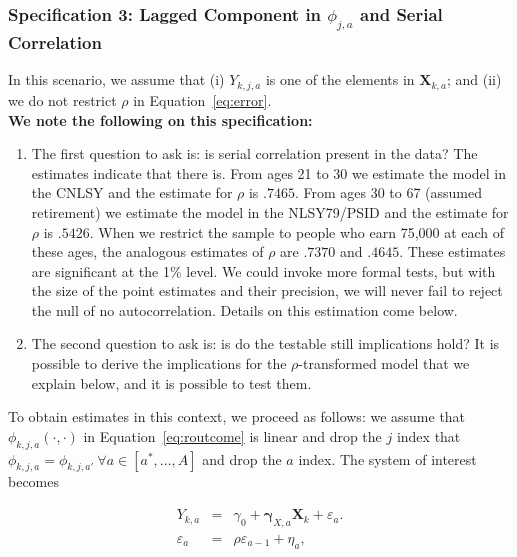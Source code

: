 \subsubsection{Specification 3: Lagged Component in $\phi_{j,a}$ and Serial Correlation} \label{section:laggedserial}

\noindent In this scenario, we assume that (i)  $Y_{k,j,a}$ is one of the elements in $\bm{X}_{k,a}$; and (ii) we do not restrict $\rho$ in Equation~\eqref{eq:error}.\\

\noindent \textbf{We note the following on this specification:}

\begin{enumerate}

\item The first question to ask is: is serial correlation present in the data? The estimates indicate that there is. From ages 21 to 30 we estimate the model in the CNLSY and the estimate for $\rho$ is $.7465$. From ages 30 to 67 (assumed retirement) we estimate the model in the NLSY79/PSID and the estimate for $\rho$ is $.5426$. When we restrict the sample to people who earn 75,000 at each of these ages, the analogous estimates of $\rho$ are $.7370$ and $.4645$. These estimates are significant at the 1\% level. We could invoke more formal tests, but with the size of the point estimates and their precision, we will never fail to reject the null of no autocorrelation. Details on this estimation come below.\\

\item The second question to ask is: is do the testable still implications hold?  It is possible to derive the implications for the $\rho$-transformed model that we explain below, and it is possible to test them.
\end{enumerate}

\noindent To obtain estimates in this context, we proceed as follows: we assume that $\phi_{k,j,a} \left( \cdot, \cdot \right)$ in Equation~\eqref{eq:routcome} is linear and drop the $j$ index that $\phi_{k,j,a} = \phi_{k,j,a'} \ \forall a \in [a^*, \ldots, A]$ and drop the $a$ index. The system of interest becomes

\begin{eqnarray}
Y_{k,a} &=&\gamma_{0} + \bm{\gamma}_{X,a} \bm{X}_{k} + \varepsilon_{a}. \label{eq:linear1} \\
\varepsilon_{a} &=& \rho \varepsilon_{a-1} + \eta_{a}, \label{eq:linear2}
\end{eqnarray}

